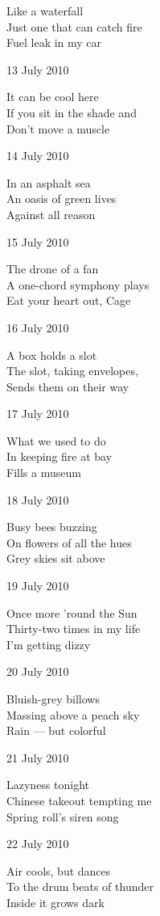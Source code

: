 \documentclass[12pt]{article}
\begin{document}
Like a waterfall \\
Just one that can catch fire \\
Fuel leak in my car

13 July 2010

It can be cool here \\
If you sit in the shade and \\
Don't move a muscle

14 July 2010

In an asphalt sea \\
An oasis of green lives \\
Against all reason

15 July 2010

The drone of a fan \\
A one-chord symphony plays \\
Eat your heart out, Cage

16 July 2010

A box holds a slot \\
The slot, taking envelopes, \\
Sends them on their way

17 July 2010

What we used to do \\
In keeping fire at bay \\
Fills a museum

\newpage

18 July 2010

Busy bees buzzing \\
On flowers of all the hues \\
Grey skies sit above

19 July 2010

Once more 'round the Sun \\
Thirty-two times in my life \\
I'm getting dizzy

20 July 2010

Bluish-grey billows \\
Massing above a peach sky \\
Rain --- but colorful

21 July 2010

Lazyness tonight \\
Chinese takeout tempting me \\
Spring roll's siren song

22 July 2010

Air cools, but dances \\
To the drum beats of thunder \\
Inside it grows dark
\end{document}
